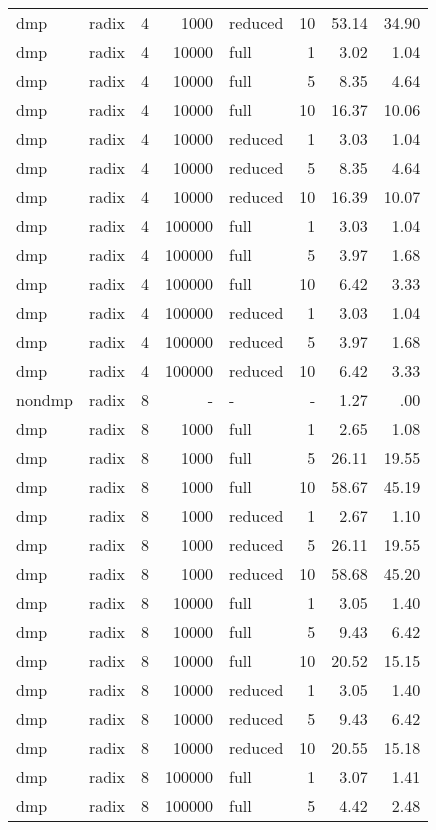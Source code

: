 \begin{center}
\begin{small}
\begin{longtable}{llrrlrrr}
dmp & radix & 4 & 1000 & reduced & 10 & 53.14 & 34.90\\
dmp & radix & 4 & 10000 & full & 1 & 3.02 & 1.04\\
dmp & radix & 4 & 10000 & full & 5 & 8.35 & 4.64\\
dmp & radix & 4 & 10000 & full & 10 & 16.37 & 10.06\\
dmp & radix & 4 & 10000 & reduced & 1 & 3.03 & 1.04\\
dmp & radix & 4 & 10000 & reduced & 5 & 8.35 & 4.64\\
dmp & radix & 4 & 10000 & reduced & 10 & 16.39 & 10.07\\
dmp & radix & 4 & 100000 & full & 1 & 3.03 & 1.04\\
dmp & radix & 4 & 100000 & full & 5 & 3.97 & 1.68\\
dmp & radix & 4 & 100000 & full & 10 & 6.42 & 3.33\\
dmp & radix & 4 & 100000 & reduced & 1 & 3.03 & 1.04\\
dmp & radix & 4 & 100000 & reduced & 5 & 3.97 & 1.68\\
dmp & radix & 4 & 100000 & reduced & 10 & 6.42 & 3.33\\
nondmp & radix & 8 & - & - & - & 1.27 & .00\\
dmp & radix & 8 & 1000 & full & 1 & 2.65 & 1.08\\
dmp & radix & 8 & 1000 & full & 5 & 26.11 & 19.55\\
dmp & radix & 8 & 1000 & full & 10 & 58.67 & 45.19\\
dmp & radix & 8 & 1000 & reduced & 1 & 2.67 & 1.10\\
dmp & radix & 8 & 1000 & reduced & 5 & 26.11 & 19.55\\
dmp & radix & 8 & 1000 & reduced & 10 & 58.68 & 45.20\\
dmp & radix & 8 & 10000 & full & 1 & 3.05 & 1.40\\
dmp & radix & 8 & 10000 & full & 5 & 9.43 & 6.42\\
dmp & radix & 8 & 10000 & full & 10 & 20.52 & 15.15\\
dmp & radix & 8 & 10000 & reduced & 1 & 3.05 & 1.40\\
dmp & radix & 8 & 10000 & reduced & 5 & 9.43 & 6.42\\
dmp & radix & 8 & 10000 & reduced & 10 & 20.55 & 15.18\\
dmp & radix & 8 & 100000 & full & 1 & 3.07 & 1.41\\
dmp & radix & 8 & 100000 & full & 5 & 4.42 & 2.48\\

\end{longtable}
\end{small}
\end{center}
